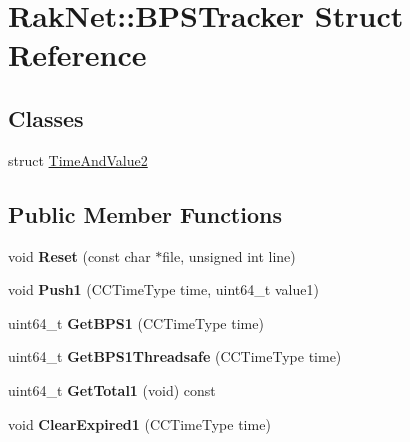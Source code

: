 \hypertarget{struct_rak_net_1_1_b_p_s_tracker}{\section{Rak\-Net\-:\-:B\-P\-S\-Tracker Struct Reference}
\label{struct_rak_net_1_1_b_p_s_tracker}
}
\subsection*{Classes}
\begin{DoxyCompactItemize}
\item 
struct \hyperlink{struct_rak_net_1_1_b_p_s_tracker_1_1_time_and_value2}{Time\-And\-Value2}
\end{DoxyCompactItemize}
\subsection*{Public Member Functions}
\begin{DoxyCompactItemize}
\item 
\hypertarget{struct_rak_net_1_1_b_p_s_tracker_a013d78c47a0836825ac7d706d1b32b92}{void {\bfseries Reset} (const char $\ast$file, unsigned int line)}\label{struct_rak_net_1_1_b_p_s_tracker_a013d78c47a0836825ac7d706d1b32b92}

\item 
\hypertarget{struct_rak_net_1_1_b_p_s_tracker_a7fe546bd11628a65c2e1b0735cfcc402}{void {\bfseries Push1} (C\-C\-Time\-Type time, uint64\-\_\-t value1)}\label{struct_rak_net_1_1_b_p_s_tracker_a7fe546bd11628a65c2e1b0735cfcc402}

\item 
\hypertarget{struct_rak_net_1_1_b_p_s_tracker_a3cebba08ffbaee15676b3963b2a0d0ff}{uint64\-\_\-t {\bfseries Get\-B\-P\-S1} (C\-C\-Time\-Type time)}\label{struct_rak_net_1_1_b_p_s_tracker_a3cebba08ffbaee15676b3963b2a0d0ff}

\item 
\hypertarget{struct_rak_net_1_1_b_p_s_tracker_a682a0dac3f4ae16e7a1627dc31e0b00f}{uint64\-\_\-t {\bfseries Get\-B\-P\-S1\-Threadsafe} (C\-C\-Time\-Type time)}\label{struct_rak_net_1_1_b_p_s_tracker_a682a0dac3f4ae16e7a1627dc31e0b00f}

\item 
\hypertarget{struct_rak_net_1_1_b_p_s_tracker_aa0a31f709fce863df3fa0c421a3066cf}{uint64\-\_\-t {\bfseries Get\-Total1} (void) const }\label{struct_rak_net_1_1_b_p_s_tracker_aa0a31f709fce863df3fa0c421a3066cf}

\item 
\hypertarget{struct_rak_net_1_1_b_p_s_tracker_a508e46a4ebb431c572ef752c57e3451a}{void {\bfseries Clear\-Expired1} (C\-C\-Time\-Type time)}\label{struct_rak_net_1_1_b_p_s_tracker_a508e46a4ebb431c572ef752c57e3451a}

\end{DoxyCompactItemize}
